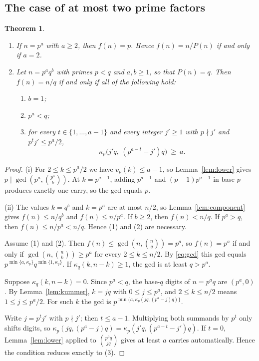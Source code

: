 \documentclass[11pt,a4paper]{article}
\newtheorem{theorem}{Theorem}[section]
\theoremstyle{definition}
\begin{document}
\subsection{The case of at most two prime factors}
\begin{theorem}\label{thm:A}
\begin{enumerate}
\item[(i)] If $n=p^a$ with $a\ge2$, then $f(n)=p$. Hence $f(n)=n/P(n)$ if and only if
  $a=2$.
\item[(ii)] Let $n=p^aq^b$ with primes $p<q$ and $a,b\ge1$, so that $P(n)=q$. Then
  $f(n)=n/q$ if and only if all of the following hold:
  \begin{enumerate}
  \item[(1)] $b=1$;
  \item[(2)] $p^a<q$;
  \item[(3)] for every $t\in\{1,\dots,a-1\}$ and every integer $j'\ge1$ with $p\nmid j'$
    and $p^tj'\le p^a/2$,
    \[
    \kappa_p\bigl(j'q,\ (p^{a-t}-j')q\bigr)\ \ge\ a .
    \]
  \end{enumerate}
\end{enumerate}
\end{theorem}

\begin{proof}
(i) For $2\le k\le p^{a}/2$ we have $v_p(k)\le a-1$, so Lemma~\ref{lem:lower} gives
$p\mid\gcd(p^a,\binom{p^a}k)$. At $k=p^{a-1}$, adding $p^{a-1}$ and $(p-1)p^{a-1}$ in base
$p$ produces exactly one carry, so the gcd equals $p$.

(ii) The values $k=q^b$ and $k=p^a$ are at most $n/2$, so Lemma~\ref{lem:component} gives
$f(n)\le n/q^b$ and $f(n)\le n/p^a$. If $b\ge2$, then $f(n)<n/q$. If $p^a>q$, then
$f(n)\le n/p^a<n/q$. Hence (1) and (2) are necessary.

Assume (1) and (2). Then $f(n)\le\gcd(n,\binom nq)=p^a$, so $f(n)=p^a$ if and only if
$\gcd(n,\binom nk)\ge p^a$ for every $2\le k\le n/2$. By \eqref{eq:gcd} this gcd equals
$p^{\min\{a,\kappa_p\}}q^{\min\{1,\kappa_q\}}$. If $\kappa_q(k,n-k)\ge1$, the gcd is at
least $q>p^a$.

Suppose $\kappa_q(k,n-k)=0$. Since $p^a<q$, the base-$q$ digits of $n=p^aq$ are $(p^a,0)$.
By Lemma~\ref{lem:kummer}, $k=jq$ with $0\le j\le p^a$, and $2\le k\le n/2$ means
$1\le j\le p^a/2$. For such $k$ the gcd is $p^{\min\{a,\kappa_p(jq,(p^a-j)q)\}}$.

Write $j=p^tj'$ with $p\nmid j'$; then $t\le a-1$. Multiplying both summands by $p^t$ only
shifts digits, so $\kappa_p(jq,(p^a-j)q)=\kappa_p(j'q,(p^{a-t}-j')q)$. If $t=0$,
Lemma~\ref{lem:lower} applied to $\binom{p^aq}{jq}$ gives at least $a$ carries
automatically. Hence the condition reduces exactly to (3).
\end{proof}
\end{document}
